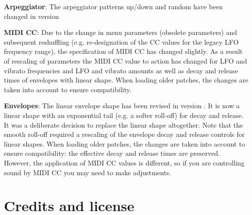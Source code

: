 \documentclass[landscape, 11pt, oneside]{report}
\newenvironment{flowtext}{\addmargin[0cm]{7cm}}{\endaddmargin} %
\begin{document}
\begin{flowtext}
\textbf{Arpeggiator}: The arpeggiator patterns up/down and random have been changed in version \version

\textbf{MIDI CC}: Due to the change in menu parameters (obsolete parameters) and subsequent reshuffling (e.g. re-designation of the CC values for the legacy LFO frequency range), the specification of MIDI CC has changed slightly. As a result of rescaling of parameters the MIDI CC value to action has changed for LFO and vibrato frequencies and LFO and vibrato amounts as well as decay and release times of envelopes with linear shape. When loading older patches, the changes are taken into account to ensure compatibility.

\textbf{Envelopes}: The linear envelope shape has been revised in version \version. It is now a linear shape with an exponential tail (e.g. a softer roll-off) for decay and release. It was a deliberate decision to replace the linear shape altogether. Note that the smooth roll-off required a rescaling of the envelope decay and release controls for linear shapes. When loading older patches, the changes are taken into account to ensure compatibility: the effective decay and release times are preserved. However, the application of MIDI CC values is different, so if you are controlling sound by MIDI CC you may need to make adjustments.

\section{Credits and license}


\end{flowtext}
\end{document}
